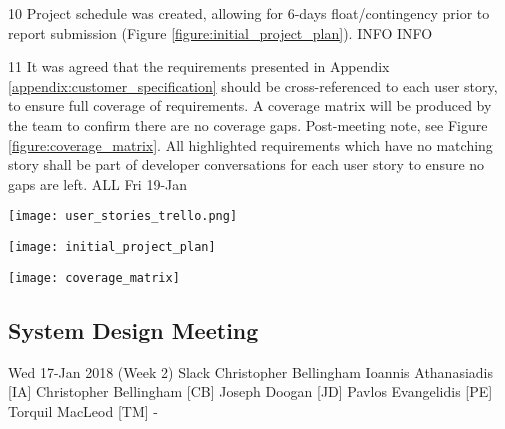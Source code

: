 \begin{momitems}
	\momitem
	{10}
	{Project schedule was created, allowing for 6-days float/contingency prior to report submission (Figure \ref{figure:initial_project_plan}).}
	{INFO}
	{INFO}

	\momitem
	{11}
	{It was agreed that the requirements presented in Appendix \ref{appendix:customer_specification} should be cross-referenced to each user story, to ensure full coverage of requirements. 
	A coverage matrix will be produced by the team to confirm there are no coverage gaps. Post-meeting note, see Figure \ref{figure:coverage_matrix}. All highlighted requirements which have no matching story shall be part of developer conversations for each user story to ensure no gaps are left.}
	{ALL}
	{Fri 19-Jan}
\end{momitems}

\begin{center}
	\texttt{[image: user\_stories\_trello.png]}
	\label{fig:user_stories_trello}
\end{center}

\begin{center}
	\texttt{[image: initial\_project\_plan]}
	\label{figure:initial_project_plan}
\end{center}

\begin{center}
	\texttt{[image: coverage\_matrix]}
	\label{figure:coverage_matrix}
\end{center}

\newpage
\subsection{System Design Meeting}
\label{appendix:design_meeting}

\momtoptable
{Wed 17-Jan 2018 (Week 2)}
{Slack}
{Christopher Bellingham}
{Ioannis Athanasiadis [IA]\newline
Christopher Bellingham [CB]\newline
Joseph Doogan [JD]\newline
Pavlos Evangelidis [PE]\newline
Torquil MacLeod [TM]}
{-}

